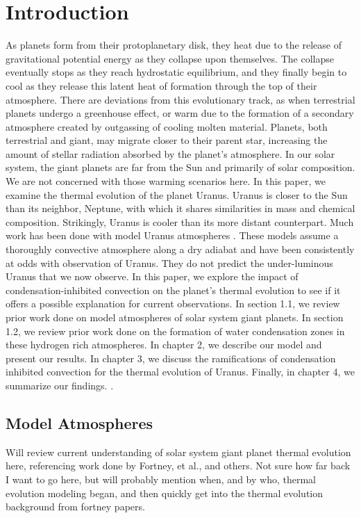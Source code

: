 \documentclass[11pt]{ucscthesisbs}
\begin{document}
\chapter{Introduction}
As planets form from their protoplanetary disk, they heat due to the release of gravitational potential energy as they collapse upon themselves. The collapse eventually stops as they reach hydrostatic equilibrium, and they finally begin to cool as they release this latent heat of formation through the top of their atmosphere. There are deviations from this evolutionary track, as when terrestrial planets undergo a greenhouse effect, or warm due to the formation of a secondary atmosphere created by outgassing of cooling molten material. Planets, both terrestrial and giant, may migrate closer to their parent star, increasing the amount of stellar radiation absorbed by the planet's atmosphere. In our solar system, the giant planets are far from the Sun and primarily of solar composition. We are not concerned with those warming scenarios here. In this paper, we examine the thermal evolution of the planet Uranus. Uranus is closer to the Sun than its neighbor, Neptune, with which it shares similarities in mass and chemical composition. Strikingly, Uranus is cooler than its more distant counterpart. Much work has been done with model Uranus atmospheres \citep{fortney_2011}. These models assume a thoroughly convective atmosphere along a dry adiabat and have been consistently at odds with observation of Uranus. They do not predict the under-luminous Uranus that we now observe. In this paper, we explore the impact of condensation-inhibited convection on the planet's thermal evolution to see if it offers a possible explanation for current observations. In section 1.1, we review prior work done on model atmospheres of solar system giant planets. In section 1.2, we review prior work done on the formation of water condensation zones in these hydrogen rich atmospheres. In chapter 2, we describe our model and present our results. In chapter 3, we discuss the ramifications of condensation inhibited convection for the thermal evolution of Uranus. Finally, in chapter 4, we summarize our findings.\citep{friedson_2017} \citep{leconte_2017}.



\section{Model Atmospheres}

Will review current understanding of solar system giant planet thermal evolution here, referencing work done by Fortney, et al., and others. Not sure how far back I want to go here, but will probably mention when, and by who, thermal evolution modeling began, and then quickly get into the thermal evolution background from fortney papers.
\end{document}
